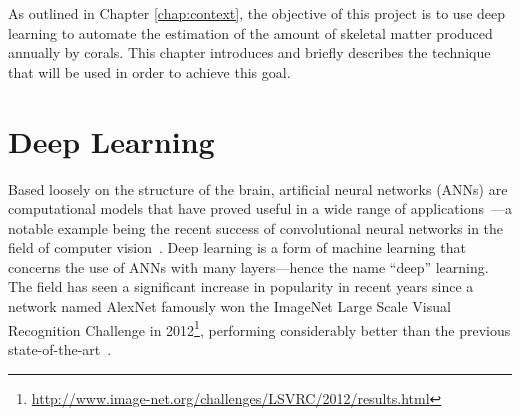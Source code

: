 


As outlined in Chapter \ref{chap:context}, the objective of this project is to use deep learning to automate the estimation of the amount of skeletal matter produced annually by corals. This chapter introduces and briefly describes the technique that will be used in order to achieve this goal.

\section{Deep Learning}
\label{sec:deeplearning}

Based loosely on the structure of the brain, artificial neural networks (ANNs) are computational models that have proved useful in a wide range of applications~\cite{lecun2015deep, healthcare, nlp}---a notable example being the recent success of convolutional neural networks in the field of computer vision~\cite{compvision, semanticsegreview}. Deep learning is a form of machine learning that concerns the use of ANNs with many layers---hence the name ``deep'' learning. The field has seen a significant increase in popularity in recent years since a network named AlexNet famously won the ImageNet Large Scale Visual Recognition Challenge in 2012\footnote{\url{http://www.image-net.org/challenges/LSVRC/2012/results.html}}, performing considerably better than the previous state-of-the-art~\cite{alexnet}.

